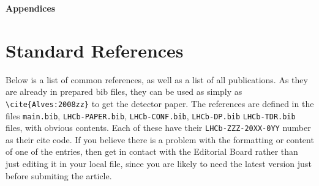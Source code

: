 
\clearpage

{\noindent\normalfont\bfseries\Large Appendices}

\appendix

\section{Standard References}
\label{sec:StandardReferences}
Below is a list of common references, as
well as a list of all \lhcb publications. 
As they are already in prepared bib files, they can be used as simply as
\texttt{\textbackslash cite\{Alves:2008zz\}} to get the \lhcb detector paper. 
The references are defined in the files \texttt{main.bib},  \texttt{LHCb-PAPER.bib},
\texttt{LHCb-CONF.bib}, \texttt{LHCb-DP.bib} \texttt{LHCb-TDR.bib} files, with obvious contents.
Each of these have their \texttt{LHCb-ZZZ-20XX-0YY} number as their cite code.
If you believe there is a problem with the formatting or
content of one of the entries, then get in contact with the Editorial
Board rather than just editing it in your local file,
since you are likely to need the latest version just before submiting the article.


